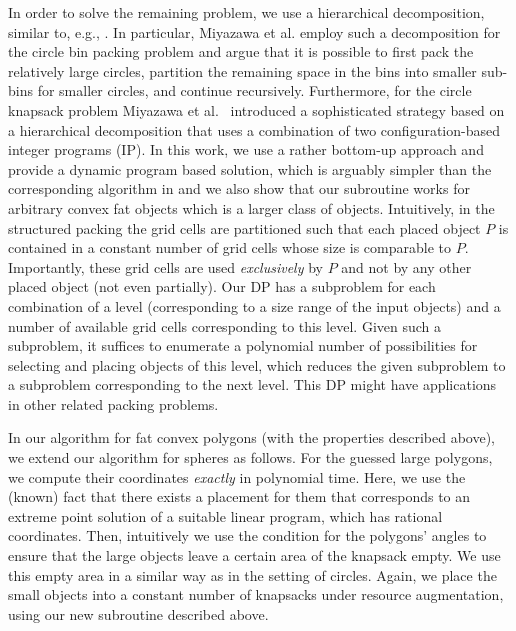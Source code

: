 {In order to solve the remaining problem, we use a hierarchical decomposition,
similar to, e.g., \cite{ErlebachJS05, JansenS08, MiyazawaPSSW16, MiyazawaWAOA}. In particular, Miyazawa et al. \cite{MiyazawaPSSW16} employ such a decomposition for the circle bin packing problem and argue that it is possible to first pack the relatively large circles, partition the remaining space in the bins into smaller sub-bins for smaller circles, and continue recursively.
Furthermore, for the circle knapsack problem
Miyazawa et al.~\cite{MiyazawaWAOA} introduced a sophisticated strategy based on a hierarchical decomposition that uses a combination of two configuration-based integer programs (IP). 
In this work, we use a rather bottom-up approach and provide a dynamic program based solution, which is arguably simpler than the corresponding algorithm in \cite{MiyazawaWAOA} and we also show that our subroutine works for arbitrary convex fat objects which is a larger class of objects.
Intuitively, in the structured packing the grid cells are
partitioned such that each placed object $P$ is contained in a constant number of grid cells
whose size is comparable to $P$. Importantly, these grid cells are used \emph{exclusively} by $P$
and not by any other placed object (not even partially). 
Our DP has a subproblem
for each combination of a level (corresponding to a size range of the input objects) and a number of
available grid cells corresponding to this level.
Given such a subproblem, it suffices to enumerate a polynomial number of possibilities for selecting and placing
objects of this level, which reduces the given subproblem
to a subproblem corresponding to the next level. This DP might have applications in other related packing problems. 


In our algorithm for fat convex polygons (with the properties described
above), we extend our algorithm for spheres as follows. For the
guessed large polygons, we compute their coordinates \emph{exactly
}in polynomial time. Here, we use the (known) fact that there exists
a placement for them that corresponds to an extreme point solution
of a suitable linear program, which has rational coordinates. Then,
intuitively we use the condition for the polygons' angles to ensure
that the large objects leave a certain area of the knapsack empty.
We use this empty area in a similar way as in the setting of circles.
Again, we place the small objects into a constant number of knapsacks
under resource augmentation, using our new subroutine described above.


}

